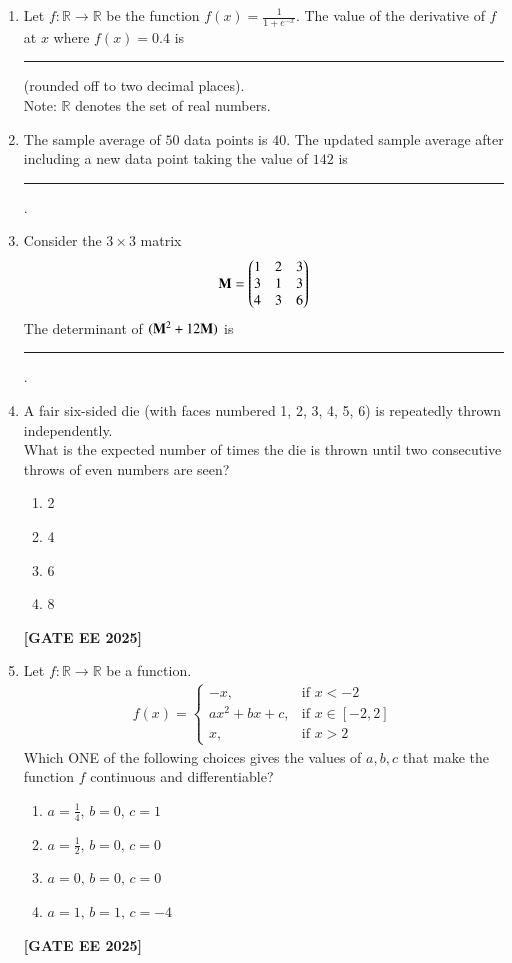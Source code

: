 \documentclass[journal]{IEEEtran}
\newcommand{\qfooter}{%
  \begin{flushright}\footnotesize\textbf{[GATE EE 2025]}\end{flushright}\vspace{1em}%
}
\begin{document}
\begin{enumerate}
\item Let $f:\mathbb{R}\to\mathbb{R}$ be the function $f(x) = \frac{1}{1+e^{-x}}$. The value of the derivative of $f$ at $x$ where $f(x) = 0.4$ is \rule{8em}{0.07em} (rounded off to two decimal places).\\
Note: $\mathbb{R}$ denotes the set of real numbers.

\item The sample average of $50$ data points is $40$. The updated sample average after including a new data point taking the value of $142$ is \rule{7em}{0.07em}.

\item Consider the $3\times 3$ matrix
\begin{align}
\mathbf{M}=
\begin{pmatrix}
1 & 2 & 3\\
3 & 1 & 3\\
4 & 3 & 6
\end{pmatrix}
\end{align}
The determinant of $(\mathbf{M}^2 + 12\mathbf{M})$ is \rule{8em}{0.07em}.

\item A fair six-sided die (with faces numbered 1, 2, 3, 4, 5, 6) is repeatedly thrown independently.\\
What is the expected number of times the die is thrown until two consecutive throws of even numbers are seen?
\begin{multicols}{2}
\begin{enumerate}
\item 2
\item 4
\item 6
\item 8
\end{enumerate} \qfooter
\end{multicols}

\item Let $f:\mathbb{R} \to \mathbb{R}$ be a function.
\begin{align}
f(x) =
\begin{cases}
-x, & \text{if } x < -2\\
a x^2 + b x + c, & \text{if } x \in [-2, 2]\\
x, & \text{if } x > 2
\end{cases}
\end{align}
Which ONE of the following choices gives the values of $a, b, c$ that make the function $f$ continuous and differentiable?
\begin{multicols}{2}
\begin{enumerate}
\item $a = \frac{1}{4},\, b=0,\, c=1$
\item $a = \frac{1}{2},\, b=0,\, c=0$
\item $a = 0,\, b=0,\, c=0$
\item $a = 1,\, b=1,\, c=-4$
\end{enumerate} \qfooter
\end{multicols}


\end{enumerate}
\end{document}
